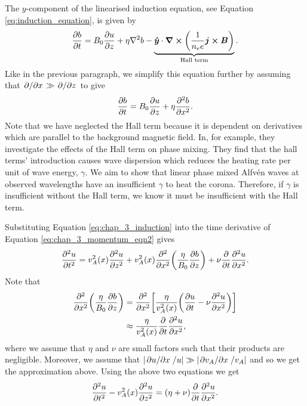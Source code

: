 The $y$-component of the linearised induction equation, see Equation \eqref{eq:induction_equation}, is given by
\begin{equation}
    \pdv{b}{t} = B_0\pdv{u}{z}+\eta\nabla^2 b - \underbrace{\boldsymbol{\hat{y}}\cdot\curl(\frac{1}{n_e e}\boldsymbol{j}\cross\boldsymbol{B})}_{\text{Hall term}}.
\end{equation}
Like in the previous paragraph, we simplify this equation further by assuming that $\pdv*{}{x}\gg\pdv*{}{z}$ to give 
\begin{equation}
    \label{eq:chap_3_induction}
    \pdv{b}{t} = B_0\pdv{u}{z}+\eta\pdv[2]{b}{x}.
\end{equation}
Note that we have neglected the Hall term because it is dependent on derivatives which are parallel to the background magnetic field. In, for example, \citet{Threlfall2017} they investigate the effects of the Hall term on phase mixing. They find that the hall terms' introduction causes wave dispersion which reduces the heating rate per unit of wave energy, $\gamma$. We aim to show that linear phase mixed Alfv\'en waves at observed wavelengths have an insufficient $\gamma$ to heat the corona. Therefore, if $\gamma$ is insufficient without the Hall term, we know it must be insufficient with the Hall term.

Substituting Equation \eqref{eq:chap_3_induction} into the time derivative of Equation \eqref{eq:chap_3_momentum_eqn2} gives
\[\pdv[2]{u}{t}=v_A^2(x)\pdv[2]{u}{z}+v_A^2(x)\pdv[2]{}{x}\qty(\frac{\eta}{B_0}\pdv{b}{z})+\nu\pdv{}{t}\pdv[2]{u}{x}.\]
Note that
\[\begin{aligned}
\pdv[2]{}{x}\qty(\frac{\eta}{B_0}\pdv{b}{z}) &= \pdv[2]{}{x}\qty[\frac{\eta}{v_A^2(x)}\qty(\pdv{u}{t} - \nu \pdv[2]{u}{x})] \\
&\approx \frac{\eta}{v_A^2(x)}\pdv{}{t}\pdv[2]{u}{x},
\end{aligned}\]
where we assume that $\eta$ and $\nu$ are small factors such that their products are negligible. Moreover, we assume that $\abs{\pdv*{u}{x}/u}\gg\abs{\pdv*{v_A}{x}/v_A}$ and so we get the approximation above. Using the above two equations we get
\begin{equation}
    \label{eq:wave_diffusion_equation}
    \pdv[2]{u}{t}-v_A^2(x)\pdv[2]{u}{z}= (\eta+\nu)\pdv{}{t}\pdv[2]{u}{x}.
\end{equation}

